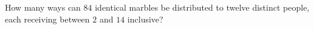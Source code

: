 How many ways can $84$ identical marbles be distributed to twelve distinct people, each receiving between $2$ and $14$ inclusive?
